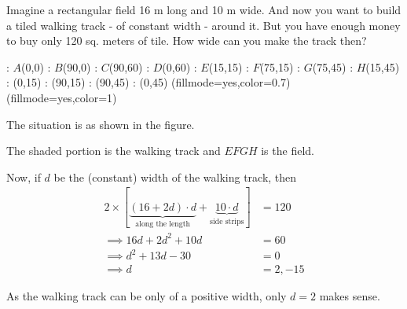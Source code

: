 

\question[2] Imagine a rectangular field 16 m long and 10 m wide. And now you want
to build a tiled walking track - of constant width - around it. But you have enough 
money to buy only 120 sq. meters of tile. How wide can you make the track then?


\ifprintanswers
    : $A$(0,0)
    : $B$(90,0)
    : $C$(90,60)
    : $D$(0,60)
    : $E$(15,15)
    : $F$(75,15)
    : $G$(75,45)
    : $H$(15,45)
    : (0,15)
    : (90,15)
    : (90,45)
    : (0,45)
  \figdrawbegin{}
    \figset (fillmode=yes,color=0.7)
    \figdrawline [100,101,102,103,100]
    \figset (fillmode=yes,color=1)
    \figdrawline [104,105,106,107,104]
  \figdrawend
  \vspace{0.7cm}
  \centerline{\box\figBoxA}
\fi 

\begin{solution}[\halfpage]
  The situation is as shown in the figure. 
  
  The shaded portion is the walking track and $EFGH$ is the field.

  Now, if $d$ be the (constant) width of the walking track, then
  \begin{align}
  	2\times\left[\underbrace{(16+2d)\cdot d}_{\text{along the length}} + 
  	\underbrace{10\cdot d}_{\text{side strips}} \right] &= 120 \\
  	\implies 16d + 2d^2 + 10d &= 60 \\
  	\implies d^2 + 13d - 30 &= 0 \\
  	\implies d &= 2, -15
  \end{align}
  
  As the walking track  can be only of a positive width, only $d = 2$ makes sense. 
\end{solution}

\ifprintanswers\begin{codex}\end{codex}\fi
